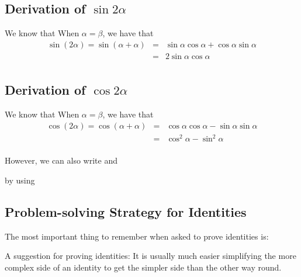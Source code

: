 \subsection{Derivation of $\sin 2 \alpha$}
We know that
\nequ{\sin(\alpha + \beta) = \sin\alpha\cos\beta+\cos\alpha\sin\beta}
When $\alpha=\beta$, we have that
\begin{eqnarray*}
\sin(2\alpha)=\sin(\alpha + \alpha) &=& \sin\alpha\cos\alpha+\cos\alpha\sin\alpha\\
&=& 2\sin\alpha\cos\alpha\\
\end{eqnarray*}

\subsection{Derivation of $\cos 2 \alpha$}
We know that
\nequ{\cos(\alpha + \beta) = \cos\alpha\cos\beta-\sin\alpha\sin\beta}
When $\alpha=\beta$, we have that
\begin{eqnarray*}
\cos(2\alpha)=\cos(\alpha + \alpha) &=& \cos\alpha\cos\alpha-\sin\alpha\sin\alpha\\
&=& \cos^2\alpha-\sin^2\alpha\\
\end{eqnarray*}

However, we can also write
and

by using


\subsection{Problem-solving Strategy for Identities}
The most important thing to remember when asked to prove identities is:

A suggestion for proving identities: It is usually much easier simplifying the more complex side of an identity to get the simpler side than the other way round. 


